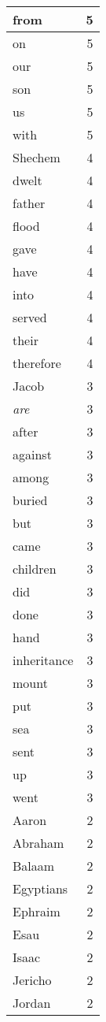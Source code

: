 \begin{center}
\begin{longtable}{l|r}
from & 5 \\ \hline
on & 5 \\ \hline
our & 5 \\ \hline
son & 5 \\ \hline
us & 5 \\ \hline
with & 5 \\ \hline
Shechem & 4 \\ \hline
dwelt & 4 \\ \hline
father & 4 \\ \hline
flood & 4 \\ \hline
gave & 4 \\ \hline
have & 4 \\ \hline
into & 4 \\ \hline
served & 4 \\ \hline
their & 4 \\ \hline
therefore & 4 \\ \hline
Jacob & 3 \\ \hline
\emph{are} & 3 \\ \hline
after & 3 \\ \hline
against & 3 \\ \hline
among & 3 \\ \hline
buried & 3 \\ \hline
but & 3 \\ \hline
came & 3 \\ \hline
children & 3 \\ \hline
did & 3 \\ \hline
done & 3 \\ \hline
hand & 3 \\ \hline
inheritance & 3 \\ \hline
mount & 3 \\ \hline
put & 3 \\ \hline
sea & 3 \\ \hline
sent & 3 \\ \hline
up & 3 \\ \hline
went & 3 \\ \hline
Aaron & 2 \\ \hline
Abraham & 2 \\ \hline
Balaam & 2 \\ \hline
Egyptians & 2 \\ \hline
Ephraim & 2 \\ \hline
Esau & 2 \\ \hline
Isaac & 2 \\ \hline
Jericho & 2 \\ \hline
Jordan & 2 \\ \hline

\end{longtable}
\end{center}
